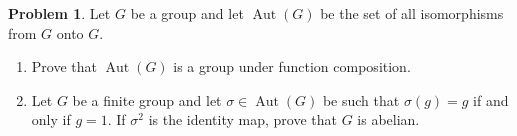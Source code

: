 \documentclass[letterpaper,11pt]{amsart}
\theoremstyle{plain}
\theoremstyle{definition}
\newtheorem{pr}{Problem}
\theoremstyle{remark}
\DeclareMathOperator{\aut}{Aut}
\begin{document}
\begin{pr}
    Let $G$ be a group and let $\aut(G)$ be the set of all isomorphisms from $G$ onto $G$.
    \begin{enumerate}
        \item Prove that $\aut(G)$ is a group under function composition.
        \item Let $G$ be a finite group and let $\sigma \in \aut(G)$ be such that $\sigma(g) = g$ if and only if $g = 1$. If $\sigma^2$ is the identity map, prove that $G$ is abelian.
    \end{enumerate}
\end{pr}
\end{document}
